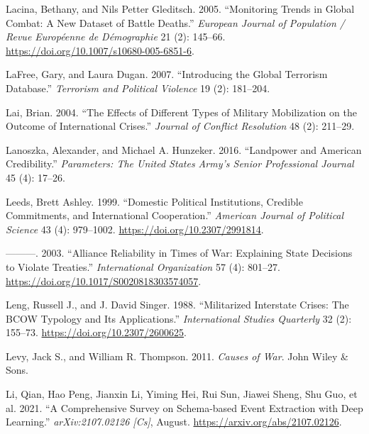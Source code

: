 \documentclass{article}
\newlength{\cslhangindent}
\newlength{\cslentryspacingunit} %
\newenvironment{CSLReferences}[2] %
 {%
  \setlength{\parindent}{0pt}
  \ifodd #1
  \let\oldpar\par
  \def\par{\hangindent=\cslhangindent\oldpar}
  \fi
  \setlength{\parskip}{#2\cslentryspacingunit}
 }%
 {}
\begin{document}
\begin{CSLReferences}{1}{0}
\leavevmode{}%
Lacina, Bethany, and Nils Petter Gleditsch. 2005. {``Monitoring {Trends}
in {Global Combat}: {A New Dataset} of {Battle Deaths}.''}
\emph{European Journal of Population / Revue Européenne de Démographie}
21 (2): 145--66. \url{https://doi.org/10.1007/s10680-005-6851-6}.

\leavevmode{}%
LaFree, Gary, and Laura Dugan. 2007. {``Introducing the Global Terrorism
Database.''} \emph{Terrorism and Political Violence} 19 (2): 181--204.

\leavevmode{}%
Lai, Brian. 2004. {``The Effects of Different Types of Military
Mobilization on the Outcome of International Crises.''} \emph{Journal of
Conflict Resolution} 48 (2): 211--29.

\leavevmode{}%
Lanoszka, Alexander, and Michael A. Hunzeker. 2016. {``Landpower and
{American} Credibility.''} \emph{Parameters: The United States Army's
Senior Professional Journal} 45 (4): 17--26.

\leavevmode{}%
Leeds, Brett Ashley. 1999. {``Domestic {Political Institutions},
{Credible Commitments}, and {International Cooperation}.''}
\emph{American Journal of Political Science} 43 (4): 979--1002.
\url{https://doi.org/10.2307/2991814}.

\leavevmode{}%
---------. 2003. {``Alliance {Reliability} in {Times} of {War}:
{Explaining State Decisions} to {Violate Treaties}.''}
\emph{International Organization} 57 (4): 801--27.
\url{https://doi.org/10.1017/S0020818303574057}.

\leavevmode{}%
Leng, Russell J., and J. David Singer. 1988. {``Militarized {Interstate
Crises}: {The BCOW Typology} and {Its Applications}.''}
\emph{International Studies Quarterly} 32 (2): 155--73.
\url{https://doi.org/10.2307/2600625}.

\leavevmode{}%
Levy, Jack S., and William R. Thompson. 2011. \emph{Causes of War}.
{John Wiley \& Sons}.

\leavevmode{}%
Li, Qian, Hao Peng, Jianxin Li, Yiming Hei, Rui Sun, Jiawei Sheng, Shu
Guo, et al. 2021. {``A {Comprehensive Survey} on {Schema-based Event
Extraction} with {Deep Learning}.''} \emph{arXiv:2107.02126 {[}Cs{]}},
August. \url{https://arxiv.org/abs/2107.02126}.


\end{CSLReferences}
\end{document}
